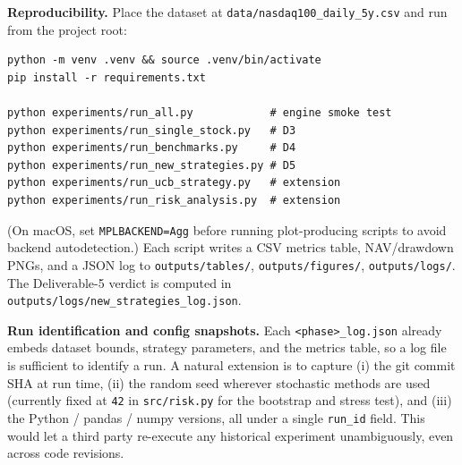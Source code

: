 \documentclass[11pt]{article}
\begin{document}
\textbf{Reproducibility.} Place the dataset at
\texttt{data/nasdaq100\_daily\_5y.csv} and run from the project root:

\begin{small}
\begin{verbatim}
python -m venv .venv && source .venv/bin/activate
pip install -r requirements.txt

python experiments/run_all.py            # engine smoke test
python experiments/run_single_stock.py   # D3
python experiments/run_benchmarks.py     # D4
python experiments/run_new_strategies.py # D5
python experiments/run_ucb_strategy.py   # extension
python experiments/run_risk_analysis.py  # extension
\end{verbatim}
\end{small}

(On macOS, set \texttt{MPLBACKEND=Agg} before running plot-producing
scripts to avoid backend autodetection.) Each script writes a CSV
metrics table, NAV/drawdown PNGs, and a JSON log to
\texttt{outputs/tables/}, \texttt{outputs/figures/},
\texttt{outputs/logs/}. The Deliverable-5 verdict is computed in
\texttt{outputs/logs/new\_strategies\_log.json}.

\textbf{Run identification and config snapshots.} Each
\texttt{<phase>\_log.json} already embeds dataset bounds, strategy
parameters, and the metrics table, so a log file is sufficient to
identify a run. A natural extension is to capture (i) the git commit
SHA at run time, (ii) the random seed wherever stochastic methods are
used (currently fixed at \texttt{42} in \texttt{src/risk.py} for the
bootstrap and stress test), and (iii) the Python / pandas / numpy
versions, all under a single \texttt{run\_id} field. This would let a
third party re-execute any historical experiment unambiguously, even
across code revisions.
\end{document}
